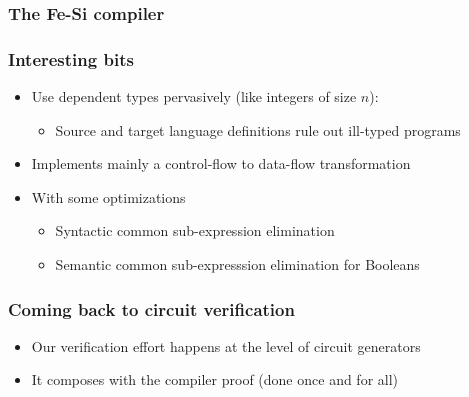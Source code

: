 \documentclass[9pt]{beamer}
\begin{document}
\begin{frame}
  \frametitle{The Fe-Si  compiler}
  \frametitle{Interesting bits}
  \begin{itemize}
  \item Use dependent types pervasively (like integers of size $n$):
    \begin{itemize}
    \item Source and target language definitions rule out ill-typed
      programs
    \end{itemize}

    \item Implements mainly a control-flow to data-flow transformation
    \item With some optimizations
      \begin{itemize}
      \item Syntactic common sub-expression elimination 
      \item Semantic common sub-expresssion elimination for Booleans
      \end{itemize}
 
  \end{itemize}
\end{frame}

\begin{frame}
  \frametitle{Coming back to circuit verification}
  \begin{center}
 \end{center}
\medskip

\begin{itemize}
\item Our verification effort happens at the level of \alert{circuit
      generators}
   
  \item  It composes with the compiler proof (done \alert{once and for all})
  \end{itemize}
\end{frame}
\end{document}

